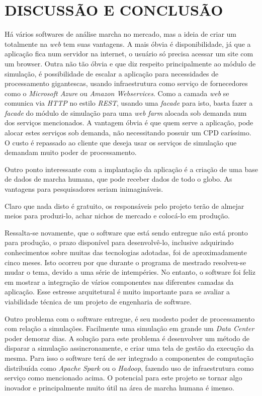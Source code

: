 \chapter[DISCUSSÃO E CONCLUSÃO]{\textbf{DISCUSSÃO E CONCLUSÃO}}

Há vários softwares de análise marcha no mercado, mas a ideia de criar um totalmente na \emph{web} tem suas vantagens. 
A mais óbvia é disponibilidade, já que a aplicação fica num servidor na internet, o usuário só precisa acessar um site com um browser. 
Outra não tão óbvia e que diz respeito principalmente ao módulo de simulação, é possibilidade de escalar a aplicação para necessidades de processamento gigantescas, usando infraestrutura como serviço de fornecedores como o \emph{Microsoft Azure} ou \emph{Amazon Webservices}.
Como a camada \emph{web} se comunica via \emph{HTTP} no estilo \emph{REST}, usando uma \emph{facade} para isto, basta fazer a \emph{facade} do módulo de simulação para uma \emph{web farm} alocada sob demanda num dos serviços mencionados. A vantagem óbvia é que quem serve a aplicação, pode alocar estes serviços sob demanda, não necessitando possuir um CPD caríssimo. O custo é repassado ao cliente que deseja usar os serviços de simulação que demandam muito poder de processamento.

Outro ponto interessante com a implantação da aplicação é a criação de uma base de dados de marcha humana, que pode receber dados de todo o globo. 
As vantagens para pesquisadores seriam inimagináveis.

Claro que nada disto é gratuito, os responsáveis pelo projeto terão de almejar meios para produzi-lo, achar nichos de mercado e colocá-lo em produção.

Ressalta-se novamente, que o software que está sendo entregue não está pronto para produção, o prazo disponível para desenvolvê-lo, inclusive adquirindo conhecimentos sobre muitas das tecnologias adotadas, foi de aproximadamente cinco meses. Isto ocorreu por que durante o programa de mestrado resolveu-se mudar o tema, devido a uma série de intempéries. No entanto, o software foi feliz em mostrar a integração de vários componentes nas diferentes camadas da aplicação. Esse estresse arquitetural é muito importante para se avaliar a viabilidade técnica de um projeto de engenharia de software.

Outro problema com o software entregue, é seu modesto poder de processamento com relação a simulações. 
Facilmente uma simulação em grande um \emph{Data Center} poder demorar dias. 
A solução para este problema é desenvolver um método de disparar a simulação assincronamente, e criar uma tela de gestão da execução da mesma. 
Para isso o software terá de ser integrado a componentes de computação distribuída como \emph{Apache Spark} ou o \emph{Hadoop}, fazendo uso de infraestrutura como serviço como mencionado acima. 
O potencial para este projeto se tornar algo inovador e principalmente muito útil na área de marcha humana é imenso.

